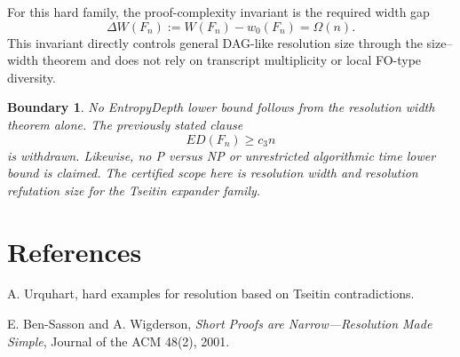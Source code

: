 \documentclass{article}
\newtheorem{boundary}{Boundary}
\begin{document}
For this hard family, the proof-complexity invariant is the required width gap
\[
\Delta W(F_n):=W(F_n)-w_0(F_n)=\Omega(n).
\]
This invariant directly controls general DAG-like resolution size through the
size--width theorem and does not rely on transcript multiplicity or local
FO-type diversity.

\begin{boundary}
No EntropyDepth lower bound follows from the resolution width theorem alone.
The previously stated clause
\[
ED(F_n)\ge c_3 n
\]
is withdrawn.  Likewise, no P versus NP or unrestricted algorithmic time
lower bound is claimed.  The certified scope here is resolution width and
resolution refutation size for the Tseitin expander family.
\end{boundary}

\section{References}

A. Urquhart, hard examples for resolution based on Tseitin contradictions.

E. Ben-Sasson and A. Wigderson,
\emph{Short Proofs are Narrow---Resolution Made Simple},
Journal of the ACM 48(2), 2001.
\end{document}

